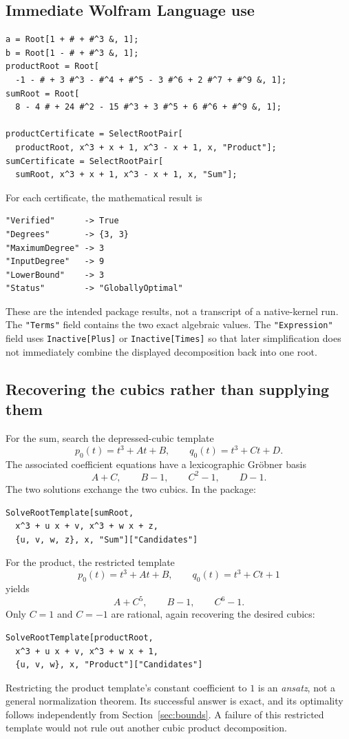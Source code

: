 \documentclass[11pt,letterpaper]{article}
\theoremstyle{definition}\newtheorem{definition}[theorem]{Definition}
\theoremstyle{remark}\newtheorem{remark}[theorem]{Remark}
\newcommand{\WL}[1]{\texttt{#1}}
\begin{document}
\subsection{Immediate Wolfram Language use}
\begin{lstlisting}
a = Root[1 + # + #^3 &, 1];
b = Root[1 - # + #^3 &, 1];
productRoot = Root[
  -1 - # + 3 #^3 - #^4 + #^5 - 3 #^6 + 2 #^7 + #^9 &, 1];
sumRoot = Root[
  8 - 4 # + 24 #^2 - 15 #^3 + 3 #^5 + 6 #^6 + #^9 &, 1];

productCertificate = SelectRootPair[
  productRoot, x^3 + x + 1, x^3 - x + 1, x, "Product"];
sumCertificate = SelectRootPair[
  sumRoot, x^3 + x + 1, x^3 - x + 1, x, "Sum"];
\end{lstlisting}
For each certificate, the mathematical result is
\begin{lstlisting}
"Verified"      -> True
"Degrees"       -> {3, 3}
"MaximumDegree" -> 3
"InputDegree"   -> 9
"LowerBound"    -> 3
"Status"        -> "GloballyOptimal"
\end{lstlisting}
These are the intended package results, not a transcript of a native-kernel run. The \WL{"Terms"} field contains the two exact algebraic values. The \WL{"Expression"} field uses \WL{Inactive[Plus]} or \WL{Inactive[Times]} so that later simplification does not immediately combine the displayed decomposition back into one root.

\subsection{Recovering the cubics rather than supplying them}
For the sum, search the depressed-cubic template
\[
 p_0(t)=t^3+At+B,\qquad q_0(t)=t^3+Ct+D.
\]
The associated coefficient equations have a lexicographic Gr\"obner basis
\begin{equation}
 A+C,\qquad B-1,\qquad C^2-1,\qquad D-1.
 \label{eq:sumgroebner}
\end{equation}
The two solutions exchange the two cubics. In the package:
\begin{lstlisting}
SolveRootTemplate[sumRoot,
  x^3 + u x + v, x^3 + w x + z,
  {u, v, w, z}, x, "Sum"]["Candidates"]
\end{lstlisting}
For the product, the restricted template
\[
 p_0(t)=t^3+At+B,\qquad q_0(t)=t^3+Ct+1
\]
yields
\begin{equation}
 A+C^5,\qquad B-1,\qquad C^6-1.
 \label{eq:prodgroebner}
\end{equation}
Only $C=1$ and $C=-1$ are rational, again recovering the desired cubics:
\begin{lstlisting}
SolveRootTemplate[productRoot,
  x^3 + u x + v, x^3 + w x + 1,
  {u, v, w}, x, "Product"]["Candidates"]
\end{lstlisting}
Restricting the product template's constant coefficient to $1$ is an \emph{ansatz}, not a general normalization theorem. Its successful answer is exact, and its optimality follows independently from Section~\ref{sec:bounds}. A failure of this restricted template would not rule out another cubic product decomposition.
\end{document}
